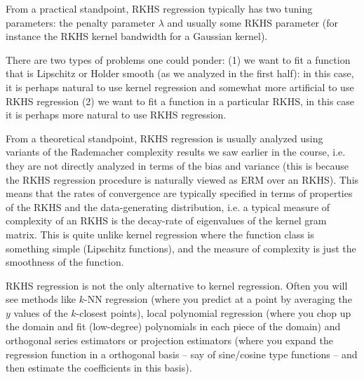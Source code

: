 \documentclass[twoside,12pt]{article}
\begin{document}
From a practical standpoint, RKHS regression typically has two tuning parameters: the penalty parameter $\lambda$ and usually some RKHS parameter (for instance the RKHS kernel bandwidth for a Gaussian kernel).

There are two types of problems one could ponder: (1) we want to fit a function that is Lipschitz or Holder smooth (as we analyzed in the first half): in this case, it is perhaps natural to use kernel regression and somewhat more artificial to use RKHS regression (2) we want to fit a function in a particular RKHS, in this case it is perhaps more natural to use RKHS regression.

From a theoretical standpoint, RKHS regression is usually analyzed using variants of the Rademacher complexity results we saw earlier in the course, i.e. they are not directly analyzed in terms of the bias and variance (this is because the RKHS regression procedure is naturally viewed as ERM over an RKHS). This means that the rates of convergence are typically specified in terms of properties of the RKHS and the data-generating distribution, i.e. a typical measure of complexity of an RKHS is the decay-rate of eigenvalues of the kernel gram matrix. This is quite unlike kernel regression where the function class is something simple (Lipschitz functions), and the measure of complexity is just the smoothness of the function.

RKHS regression is not the only alternative to kernel regression. Often you will see methods like $k$-NN regression (where you predict at a point by averaging the $y$ values of the $k$-closest points), local polynomial regression (where you chop up the domain and fit (low-degree) polynomials in each piece of the domain) and orthogonal series estimators or projection estimators (where you expand the regression function in a orthogonal basis -- say of sine/cosine type functions -- and then estimate the coefficients in this basis).
\end{document}
